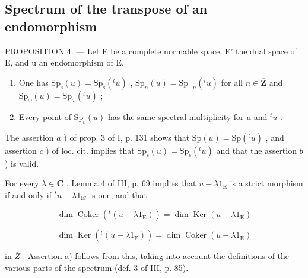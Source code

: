 \subsection{Spectrum of the transpose of an endomorphism}

PROPOSITION 4. --- Let E be a complete normable space, E' the dual space of E, and u an endomorphism of E.

\begin{enumerate}
\def\labelenumi{\alph{enumi})}
\item
  One has \(\mathrm{Sp}_{\mathrm{s}}(u) = \mathrm{Sp}_{\mathrm{s}}(^{t}u)\) , \(\mathrm{Sp}_n(u) = \mathrm{Sp}_{-n}(^t u)\) for all \(n \in \overline{\mathbf{Z}}\) and \(\mathrm{Sp}_{\omega}(u) = \mathrm{Sp}_{\omega}(^t u)\) ;
\item
  Every point of \(\mathrm{Sp}_{\mathrm{s}}(u)\) has the same spectral multiplicity for u and \({}^{t}u\) .
\end{enumerate}

The assertion \(a\) ) of prop. 3 of I, p. 131 shows that \(\mathrm{Sp}(u) = \mathrm{Sp}({}^{t}u)\) , and assertion \(c\) ) of loc. cit. implies that \(\mathrm{Sp}_{\mathrm{s}}(u) = \mathrm{Sp}_{\mathrm{s}}({}^{t}u)\) and that the assertion \(b\) ) is valid.

For every \(\lambda \in \mathbf{C}\) , Lemma 4 of III, p. 69 implies that \(u - \lambda 1_{\mathrm{E}}\) is a strict morphism if and only if \({}^{t}u - \lambda 1_{\mathrm{E}'}\) is one, and that

\[
\dim \operatorname{Coker} (^ {t} (u - \lambda 1 _ {\mathrm{E}})) = \dim \operatorname{Ker} (u - \lambda 1 _ {\mathrm{E}})
\]

\[
\dim \operatorname{Ker} (^ {t} (u - \lambda 1 _ {\mathrm{E}})) = \dim \operatorname{Coker} (u - \lambda 1 _ {\mathrm{E}})
\]

in \(\overline{Z}\) . Assertion a) follows from this, taking into account the definitions of the various parts of the spectrum (def. 3 of III, p. 85).

